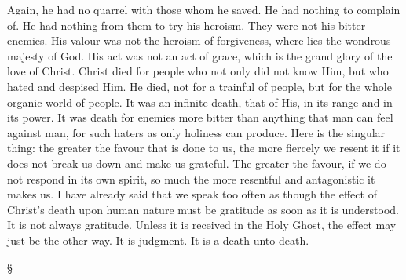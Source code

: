 \documentclass[12pt,a5paper,twoside,titlepage]{book}
\begin{document}
Again, he had no quarrel with those whom he 
saved. He had nothing to complain of. He had 
nothing from them to try his heroism. They 
were not his bitter enemies. His valour was 
not the heroism of forgiveness, where lies the 
wondrous majesty of God. His act was not 
an act of grace, which is the grand glory of 
the love of Christ. Christ died for people who 
not only did not know Him, but who hated and 
despised Him. He died, not for a trainful of 
people, but for the whole organic world of
people. It was an infinite death, that of His, 
in its range and in its power. It was death 
for enemies more bitter than anything that 
man can feel against man, for such haters as 
only holiness can produce. Here is the singular 
thing: the greater the favour that is done to 
us, the more fiercely we resent it if it does not 
break us down and make us grateful. The 
greater the favour, if we do not respond in its 
own spirit, so much the more resentful and 
antagonistic it makes us. I have already said 
that we speak too often as though the effect 
of Christ's death upon human nature must be 
gratitude as soon as it is understood. It is 
not always gratitude. Unless it is received in 
the Holy Ghost, the effect may just be the 
other way. It is judgment. It is a death unto 
death. 

\begin{center} \S \end{center}
\end{document}
